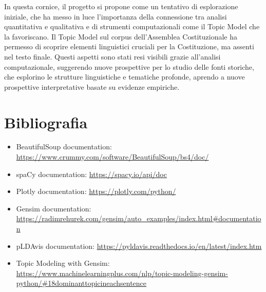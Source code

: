 \documentclass[11pt,twocolumn]{article}
\begin{document}
In questa cornice, il progetto si propone come un tentativo di esplorazione iniziale, che ha messo in luce l'importanza della connessione tra analisi quantitativa e qualitativa e di strumenti computazionali come il Topic Model che la favoriscano. Il Topic Model sul corpus dell'Assemblea Costituzionale ha permesso di scoprire elementi linguistici cruciali per la Costituzione, ma assenti nel testo finale. Questi aspetti sono stati resi visibili grazie all'analisi computazionale, suggerendo nuove prospettive per lo studio delle fonti storiche, che esplorino le strutture linguistiche e tematiche profonde, aprendo a nuove prospettive interpretative basate su evidenze empiriche.

\newpage

\section{\textbf{Bibliografia}}
\begin{itemize}

\item {BeautifulSoup documentation}: \url{https://www.crummy.com/software/BeautifulSoup/bs4/doc/}
\item {spaCy documentation}: 
\url{https://spacy.io/api/doc}
\item {Plotly documentation}: 
\url{https://plotly.com/python/}
\item {Gensim documentation}: 
\url{https://radimrehurek.com/gensim/auto_examples/index.html#documentation}
\item {pLDAvis documentation}: 
\url{https://pyldavis.readthedocs.io/en/latest/index.htm}
\item {Topic Modeling with Gensim}:
\url{https://www.machinelearningplus.com/nlp/topic-modeling-gensim-python/#18dominanttopicineachsentence}


\end{itemize}
\end{document}

